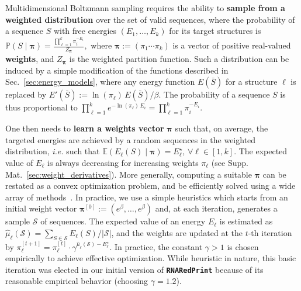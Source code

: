 \documentclass{bioinfo}
\newcommand{\val}{\bar S} %
\newcommand{\partfun}[1]{Z_{#1}}
\newcommand{\Def}[1]{{\bfseries #1}}
\newcommand{\TargetE}{E^{\star}}
\newcommand{\ourprog}{{\tt \bfseries{}\color{black!75}RNA\textcolor{red!70!black}{Red}Print}}
\begin{document}
Multidimensional Boltzmann sampling requires the ability to \Def{sample from a weighted distribution} over the set of valid sequences, where the probability of a sequence $S$ with free energies $(E_1,\ldots,E_k)$ for its target structures is
$\mathbb{P}(S\mid \pmb{\pi}) = \frac{\prod_{\ell=1}^{k} \pi_i^{-E_i}}{\partfun{\pmb{\pi}}},$
where $\pmb{\pi}:=(\pi_1\cdots\pi_k)$ is a vector of positive real-valued \Def{weights}, and $\partfun{\pmb{\pi}}$ is the weighted partition function. Such a distribution can be induced by a simple modification of the functions described in Sec.~\ref{sec:energy_models}, where any energy function $E(\val)$ for a structure $\ell$ is replaced by $E'(\val):= \ln(\pi_\ell)\, E(\val)/\beta$. The probability of a sequence $S$ is thus proportional to
$ \prod_{\ell=1}^{k} e^{-\ln(\pi_\ell)\, E_i} = \prod_{\ell=1}^{k} \pi_i^{-E_i}. $

One then needs to \Def{learn a weights vector} $\pmb{\pi}$ such that, on average, the targeted energies are achieved by a random sequences in the weighted distribution, \emph{i.e.} such that  $\mathbb{E}(E_\ell(S)\mid \pmb{\pi})=\TargetE_\ell$,  $\forall\ell\in[1,k]$.
The expected value of $E_\ell$ is always decreasing for increasing weights $\pi_\ell$ (see Supp. Mat.~\ref{sec:weight_derivatives}). More generally, computing a suitable $\pmb{\pi}$ can be restated as a convex optimization problem, and be efficiently solved using a wide array of methods~\citep{Denise2010,Bendkowski2017}.
In practice, we use a simple heuristics which starts from an initial weight vector $\pmb{\pi}^{[0]}:=(e^\beta,\dots,e^\beta)$ and, at each iteration, generates a sample $\mathcal{S}$ of sequences. The expected value of an energy $E_\ell$ is estimated as $\hat\mu_\ell(\mathcal{S}) = \sum_{S\in\mathcal{S}}E_\ell(S)/|\mathcal{S}|$, and the weights are updated at the $t$-th iteration by %
$\pi_\ell^{[t+1]} = \pi_\ell^{[t]}\cdot \gamma^{\hat\mu_\ell(\mathcal{S})-\TargetE_\ell}$. In practice, the constant $\gamma>1$ is chosen empirically to achieve effective optimization.
While heuristic in nature, this basic iteration was elected in our initial version of \ourprog{} because of its reasonable empirical behavior (choosing $\gamma=1.2$).
\end{document}
